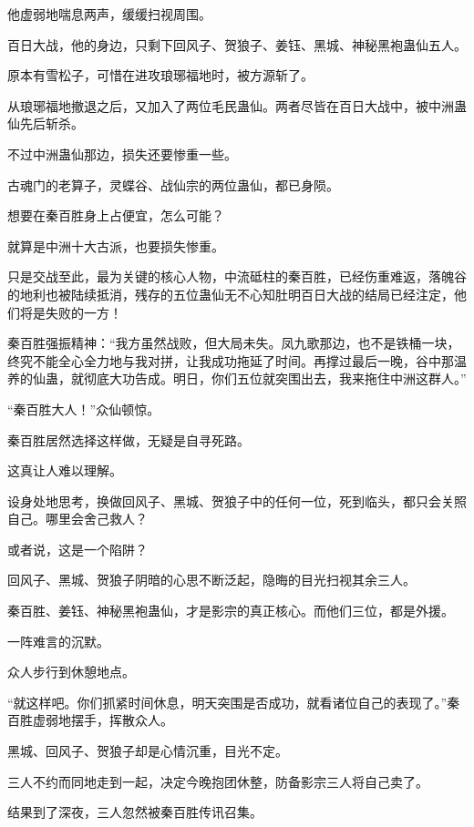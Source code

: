 \begin{this_body}
他虚弱地喘息两声，缓缓扫视周围。

百日大战，他的身边，只剩下回风子、贺狼子、姜钰、黑城、神秘黑袍蛊仙五人。

原本有雪松子，可惜在进攻琅琊福地时，被方源斩了。

从琅琊福地撤退之后，又加入了两位毛民蛊仙。两者尽皆在百日大战中，被中洲蛊仙先后斩杀。

不过中洲蛊仙那边，损失还要惨重一些。

古魂门的老算子，灵蝶谷、战仙宗的两位蛊仙，都已身陨。

想要在秦百胜身上占便宜，怎么可能？

就算是中洲十大古派，也要损失惨重。

只是交战至此，最为关键的核心人物，中流砥柱的秦百胜，已经伤重难返，落魄谷的地利也被陆续抵消，残存的五位蛊仙无不心知肚明百日大战的结局已经注定，他们将是失败的一方！

秦百胜强振精神：“我方虽然战败，但大局未失。凤九歌那边，也不是铁桶一块，终究不能全心全力地与我对拼，让我成功拖延了时间。再撑过最后一晚，谷中那温养的仙蛊，就彻底大功告成。明日，你们五位就突围出去，我来拖住中洲这群人。”

“秦百胜大人！”众仙顿惊。

秦百胜居然选择这样做，无疑是自寻死路。

这真让人难以理解。

设身处地思考，换做回风子、黑城、贺狼子中的任何一位，死到临头，都只会关照自己。哪里会舍己救人？

或者说，这是一个陷阱？

回风子、黑城、贺狼子阴暗的心思不断泛起，隐晦的目光扫视其余三人。

秦百胜、姜钰、神秘黑袍蛊仙，才是影宗的真正核心。而他们三位，都是外援。

一阵难言的沉默。

众人步行到休憩地点。

“就这样吧。你们抓紧时间休息，明天突围是否成功，就看诸位自己的表现了。”秦百胜虚弱地摆手，挥散众人。

黑城、回风子、贺狼子却是心情沉重，目光不定。

三人不约而同地走到一起，决定今晚抱团休整，防备影宗三人将自己卖了。

结果到了深夜，三人忽然被秦百胜传讯召集。

\end{this_body}

